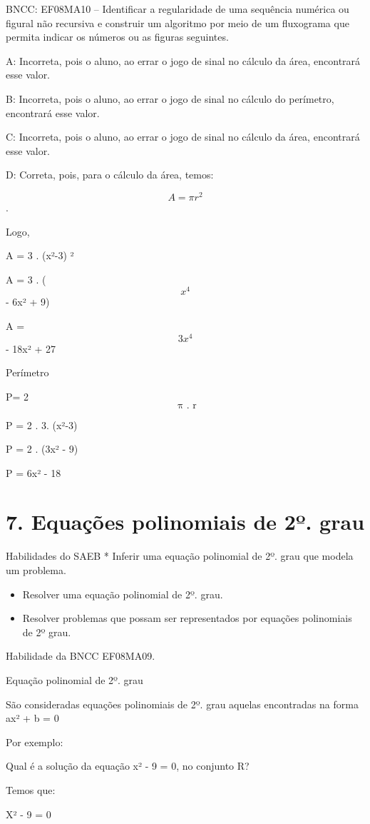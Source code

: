 BNCC: EF08MA10 -- Identificar a regularidade de uma sequência numérica
ou figural não recursiva e construir um algoritmo por meio de um
fluxograma que permita indicar os números ou as figuras seguintes.

A: Incorreta, pois o aluno, ao errar o jogo de sinal no cálculo da área,
encontrará esse valor.

B: Incorreta, pois o aluno, ao errar o jogo de sinal no cálculo do
perímetro, encontrará esse valor.

C: Incorreta, pois o aluno, ao errar o jogo de sinal no cálculo da área,
encontrará esse valor.

D: Correta, pois, para o cálculo da área, temos:

\[A = \pi r^{2}\].

Logo,

A = 3 . (x²-3) ²

A = 3 . (\[x^4\] - 6x² + 9)

A = \[3x^4\] - 18x² + 27

Perímetro

P= 2\[\text{\ π\ .\ r}\]

P = 2 . 3. (x²-3)

P = 2 . (3x² - 9)

P = 6x² - 18


\section{7. Equações polinomiais de 2º.
grau}

Habilidades do SAEB * Inferir uma equação polinomial de 2º. grau que
modela um problema.

\begin{itemize}
\item
  Resolver uma equação polinomial de 2º. grau.
\item
  Resolver problemas que possam ser representados por equações
  polinomiais de 2º grau.
\end{itemize}

Habilidade da BNCC EF08MA09.

Equação polinomial de 2º. grau

São consideradas equações polinomiais de 2º. grau aquelas encontradas na
forma ax² + b = 0

Por exemplo:

Qual é a solução da equação x² - 9 = 0, no conjunto R?

Temos que:

X² - 9 = 0

